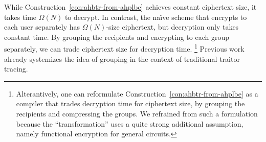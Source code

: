 While Construction~\ref{con:ahbtr-from-ahplbe} achieves constant ciphertext size,
it takes time $\Omega(N)$ to decrypt.
In contrast, the na{\"i}ve scheme that encrypts to each user separately has $\Omega(N)$-size ciphertext,
but decryption only takes constant time.
By grouping the recipients and encrypting to each group separately,
we can trade ciphertext size for decryption time.%
\footnote{Alterantively, one can reformulate Construction~\ref{con:ahbtr-from-ahplbe} as a compiler that trades decryption time for ciphertext size, by grouping the recipients and compressing the groups.
We refrained from such a formulation because the ``transformation'' uses a quite strong additional assumption, namely functional encryption for general circuits.}
Previous work~\cite{C:Zhandry20} already systemizes the idea of grouping in the context of traditional traitor tracing.
